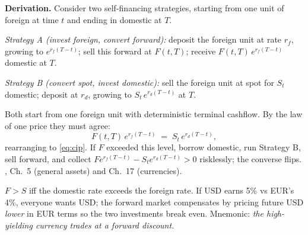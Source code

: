 \textbf{Derivation.}  Consider two self-financing strategies,
starting from one unit of foreign at time $t$ and ending in domestic
at $T$.

\textit{Strategy A (invest foreign, convert forward):} deposit the
foreign unit at rate $r_f$, growing to $e^{r_f (T-t)}$; sell this
forward at $F(t,T)$; receive $F(t,T)\,e^{r_f(T-t)}$ domestic at $T$.

\textit{Strategy B (convert spot, invest domestic):} sell the
foreign unit at spot for $S_t$ domestic; deposit at $r_d$, growing
to $S_t \, e^{r_d(T-t)}$ at $T$.

Both start from one foreign unit with deterministic terminal
cashflow.  By the law of one price they must agree:
\begin{equation}
  F(t,T) \, e^{r_f(T-t)} \;=\; S_t \, e^{r_d(T-t)},
\end{equation}
rearranging to \cref{eq:cip}.  If $F$ exceeded this level, borrow
domestic, run Strategy B, sell forward, and collect
$Fe^{r_f(T-t)} - S_t e^{r_d(T-t)} > 0$ risklessly; the converse
flips.  \citeHull, Ch.\ 5 (general assets) and Ch.\ 17 (currencies).

\begin{intuitionbox}
$F > S$ iff the domestic rate exceeds the foreign rate.  If USD
earns 5\% vs EUR's 4\%, everyone wants USD; the forward market
compensates by pricing future USD \emph{lower} in EUR terms so the
two investments break even.  Mnemonic: \emph{the high-yielding
currency trades at a forward discount.}
\end{intuitionbox}

